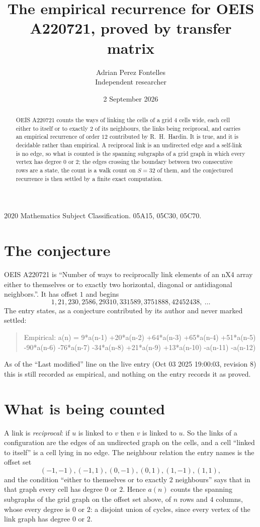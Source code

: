 \documentclass[11pt,a4paper]{article}
\title{The empirical recurrence for OEIS A220721, proved by transfer matrix}
\author{Adrian Perez Fontelles\\ \small Independent researcher}
\date{2 September 2026}
\theoremstyle{plain}
\theoremstyle{definition}
\begin{document}
\maketitle

\begin{abstract}
OEIS A220721 counts the ways of linking the cells of a grid $4$ cells wide, each cell either to
itself or to exactly $2$ of its neighbours, the links being reciprocal, and carries an
empirical recurrence of order $12$ contributed by R.~H.~Hardin. It is true, and it is
decidable rather than empirical. A reciprocal link is an undirected edge and a self-link is
no edge, so what is counted is the spanning subgraphs of a grid graph in which every vertex
has degree $0$ or $2$; the edges crossing the boundary between two consecutive rows are a
state, the count is a walk count on $S=32$ of them, and the conjectured recurrence is then
settled by a finite exact computation.
\end{abstract}

\noindent\small 2020 Mathematics Subject Classification. 05A15, 05C30, 05C70.\normalsize

\section{The conjecture}

OEIS A220721 is ``Number of ways to reciprocally link elements of an nX4 array either to themselves or to exactly two horizontal, diagonal or antidiagonal neighbors.''. It has offset $1$ and begins
\[
1, 21, 230, 2586, 29310, 331589, 3751888, 42452438,\ \dots
\]
The entry states, as a conjecture contributed by its author and never marked settled:
\begin{quote}
Empirical: a(n) = 9*a(n-1) +20*a(n-2) +64*a(n-3) +65*a(n-4) +51*a(n-5) -90*a(n-6) -76*a(n-7) -34*a(n-8) +21*a(n-9) +13*a(n-10) -a(n-11) -a(n-12)
\end{quote}
As of the ``Last modified'' line on the live entry (Oct 03 2025 19:00:03, revision 8) this is still
recorded as empirical, and nothing on the entry records it as proved.

\section{What is being counted}

A link is \emph{reciprocal}: if $u$ is linked to $v$ then $v$ is linked to $u$. So the links
of a configuration are the edges of an undirected graph on the cells, and a cell ``linked to
itself'' is a cell lying in no edge. The neighbour relation the entry names is the offset set
\[
(-1,-1), (-1,1), (0,-1), (0,1), (1,-1), (1,1),
\]
and the condition ``either to themselves or to exactly $2$ neighbours'' says that in that
graph every cell has degree $0$ or $2$. Hence $a(n)$ counts the spanning subgraphs of the
grid graph on the offset set above, of $n$ rows and $4$ columns,
whose every degree is $0$ or $2$: a disjoint union of cycles, since every vertex of the link graph has degree $0$ or $2$.
\end{document}
